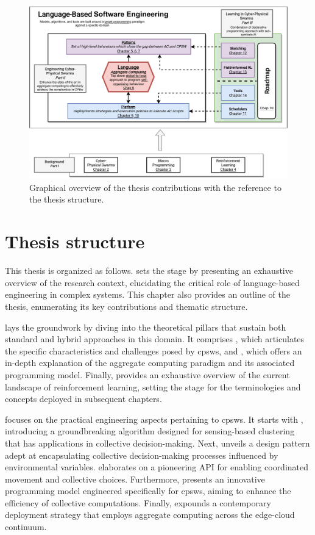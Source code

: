 \begin{refsection}
\begin{figure}
    \includegraphics[width=\textwidth]{chapters/img/contribution-visual-2.drawio.pdf}
    \caption{Graphical overview of the thesis contributions with the reference to the thesis structure.}\label{fig:contributions}
\end{figure}
\section{Thesis structure}
This thesis is organized as follows.
 sets the stage by presenting an exhaustive overview of the research context, 
 elucidating the critical role of language-based engineering in complex systems. 
 This chapter also provides an outline of the thesis, enumerating its key contributions and thematic structure.

 lays the groundwork by diving into the theoretical pillars that sustain both standard and hybrid approaches in this domain. 
 It comprises , which articulates the specific characteristics and challenges posed by \acp{cpsw}, and , 
 which offers an in-depth explanation of the aggregate computing paradigm and its associated programming model.
 Finally,  provides an exhaustive overview of the current landscape of reinforcement learning, 
 setting the stage for the terminologies and concepts deployed in subsequent chapters. 

 focuses on the practical engineering aspects pertaining to \acp{cpsw}. 
 It starts with , introducing a groundbreaking algorithm designed for sensing-based clustering that has applications in collective decision-making. 
 Next,  unveils a design pattern adept at encapsulating collective decision-making processes influenced by environmental variables. 
  elaborates on a pioneering API for enabling coordinated movement and collective choices.
 Furthermore,  presents an innovative programming model engineered specifically for \acp{cpsw}, aiming to enhance the efficiency of collective computations. 
 Finally,  expounds a contemporary deployment strategy that employs aggregate computing across the edge-cloud continuum.


\end{refsection}
